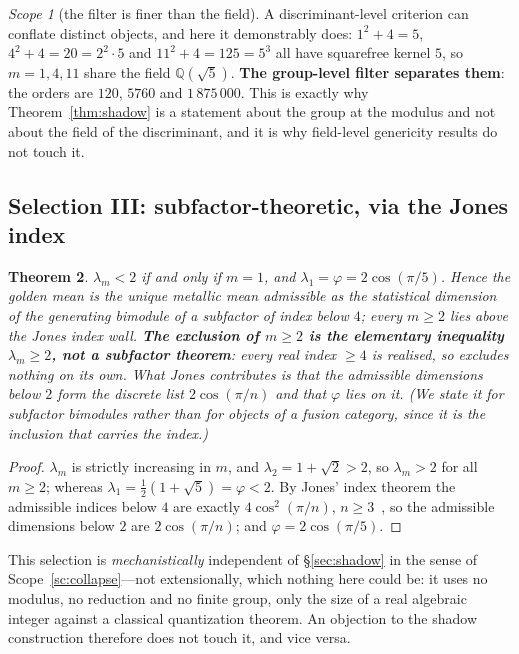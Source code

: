 \documentclass[11pt,reqno]{amsart}
\theoremstyle{plain}
\newtheorem{theorem}{Theorem}[section]
\theoremstyle{definition}
\theoremstyle{remark}
\newtheorem{scope}[theorem]{Scope}
\newcommand{\Q}{\mathbb{Q}}
\begin{document}
\begin{scope}[the filter is finer than the field]\label{sc:finer}
A discriminant-level criterion can conflate distinct objects, and here it demonstrably
does: $1^2{+}4=5$, $4^2{+}4=20=2^2\cdot5$ and $11^2{+}4=125=5^3$ all have squarefree
kernel $5$, so $m=1,4,11$ share the field $\Q(\sqrt5)$. \textbf{The group-level filter
separates them}: the orders are $120$, $5760$ and $1\,875\,000$. This is exactly why
Theorem~\ref{thm:shadow} is a statement about the group at the modulus and not about the
field of the discriminant, and it is why field-level genericity results do not touch it.
\end{scope}

\subsection{Selection III: subfactor-theoretic, via the Jones index}\label{sec:jones}

\begin{theorem}\label{thm:jones}
$\lambda_m<2$ if and only if $m=1$, and $\lambda_1=\varphi=2\cos(\pi/5)$. Hence the golden mean is the unique metallic mean admissible as the \emph{statistical
dimension of the generating bimodule of a subfactor of index below $4$}; every $m\ge2$
lies above the Jones index wall. \textbf{The exclusion of $m\ge2$ is the elementary
inequality $\lambda_m\ge2$, not a subfactor theorem}: every real index $\ge4$ is
realised, so \cite{Jones} excludes nothing on its own. What Jones contributes is that
the admissible dimensions \emph{below} $2$ form the discrete list $2\cos(\pi/n)$ and
that $\varphi$ lies on it. (We state it for subfactor bimodules rather than for
objects of a fusion category, since it is the inclusion that carries the index.)
\end{theorem}

\begin{proof}
$\lambda_m$ is strictly increasing in $m$, and $\lambda_2=1+\sqrt2>2$, so $\lambda_m>2$
for all $m\ge2$; whereas $\lambda_1=\tfrac12(1+\sqrt5)=\varphi<2$. By Jones' index
theorem the admissible indices below $4$ are exactly $4\cos^2(\pi/n)$, $n\ge3$~\cite{Jones}, so the
admissible dimensions below $2$ are $2\cos(\pi/n)$; and $\varphi=2\cos(\pi/5)$.
\end{proof}

This selection is \emph{mechanistically} independent of \S\ref{sec:shadow} in the sense
of Scope~\ref{sc:collapse}---not extensionally, which nothing here could be: it uses no
modulus, no reduction and no finite group, only the size of a real algebraic integer
against a classical quantization theorem. An objection to the shadow construction
therefore does not touch it, and vice versa.
\end{document}
